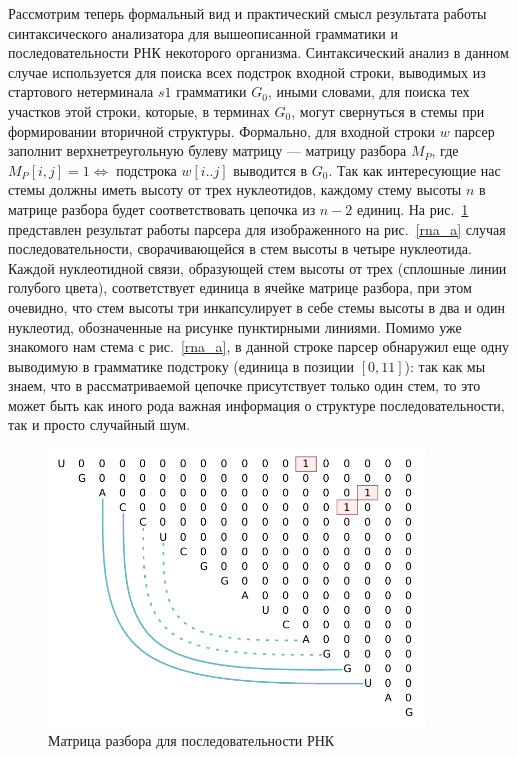 Рассмотрим теперь формальный вид и практический смысл результата работы синтаксического анализатора для вышеописанной грамматики и последовательности РНК некоторого организма. Синтаксический анализ в данном случае используется для поиска всех подстрок входной строки, выводимых из стартового нетерминала $s1$ грамматики $G_0$, иными словами, для поиска тех участков этой строки, которые, в терминах $G_0$, могут свернуться в стемы при формировании вторичной структуры. Формально, для входной строки $w$ парсер заполнит верхнетреугольную булеву матрицу --- матрицу разбора $M_P$, где $M_P[i,j]=1 \iff$ подстрока $w[i..j]$ выводится в $G_0$. Так как интересующие нас стемы должны иметь высоту от трех нуклеотидов, каждому стему высоты $n$ в матрице разбора будет соответствовать цепочка из $n - 2$ единиц. На рис.~\ref{mtrx} представлен результат работы парсера для изображенного на рис.~\ref{rna_a} случая последовательности, сворачивающейся в стем высоты в четыре нуклеотида. Каждой нуклеотидной связи, образующей стем высоты от трех (сплошные линии голубого цвета), соответствует единица в ячейке матрице разбора, при этом очевидно, что  стем высоты три инкапсулирует в себе стемы высоты в два и один нуклеотид, обозначенные на рисунке пунктирными линиями. Помимо уже знакомого нам стема с рис.~\ref{rna_a}, в данной строке парсер обнаружил еще одну выводимую в грамматике подстроку (единица в позиции $[0,11]$): так как мы знаем, что в рассматриваемой цепочке присутствует только один стем, то это может быть как иного рода важная информация о структуре последовательности, так и просто случайный шум.


\begin{figure}[h]
\begin{center}
\centering
\includegraphics[width=10.0cm]{pics/matrix.pdf}
\caption{Матрица разбора для последовательности РНК}
\label{mtrx}
\end{center}
\end{figure} 

